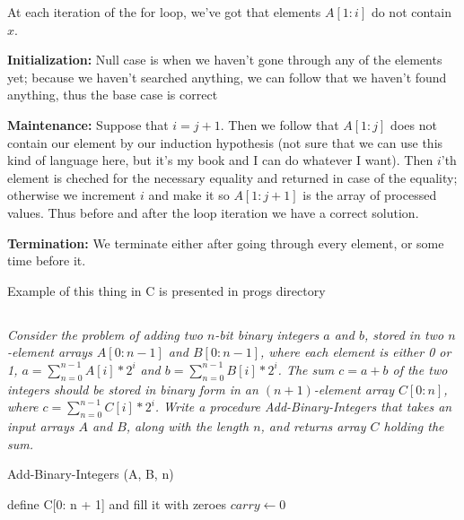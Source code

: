\documentclass[11pt,oneside,titlepage]{book}
\begin{document}
At each iteration of the for loop, we've got that elements $A[1:i]$ do not contain $x$.

\textbf{Initialization: }
Null case is when we haven't gone through any of the elements yet;
because we haven't searched anything, we
can follow that we haven't found anything, thus the base case is correct

\textbf{Maintenance: }
Suppose that $i = j + 1$. Then we follow that $A[1:j]$ does not contain our element by our
induction hypothesis (not sure that we can use this kind of language here, but it's
my book and I can do whatever I want). Then $i$'th element is cheched for the necessary
equality and returned in case of the equality; otherwise we increment $i$ and make it so
$A[1: j + 1]$ is the array of processed values. Thus before and after the loop iteration
we have a correct solution.

\textbf{Termination: }
We terminate either after going through every element, or some time before it.

Example of this thing in C is presented in progs directory


\subsection{}

\textit{Consider the problem of adding two $n$-bit binary integers $a$ and $b$, stored in
  two $n$-element arrays $A[0: n - 1]$ and $B[0: n - 1]$, where each element is either 0 or 1,
  $a = \sum_{n = 0}^{n - 1}A[i] * 2^i$ and $b = \sum_{n = 0}^{n - 1}B[i] * 2^i$. The
  sum $c = a + b$ of the two integers should be stored in binary form in an $(n + 1)$-element array
  $C[0:n]$, where   $c = \sum_{n = 0}^{n - 1}C[i] * 2^i$. Write a procedure Add-Binary-Integers
  that takes an input arrays $A$ and $B$, along with the length $n$, and returns array $C$ holding
  the sum.}


\begin{function}
  \caption{Add-Binary-Integers (A, B, n)}
  define C[0: n + 1] and fill it with zeroes\;
  $carry \leftarrow 0$\;
  \;

\end{function}
\end{document}

